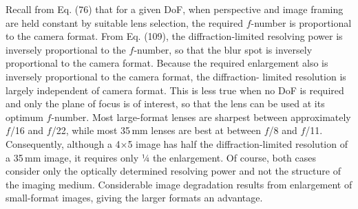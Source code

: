 \documentclass[11pt, oneside]{scrartcl}   	%
\begin{document}
Recall from Eq. (76) that for a given DoF, when perspective and
image framing are held constant by suitable lens selection, the
required $f$-number is proportional to the camera format. From
Eq. (109), the diffraction-limited resolving power is inversely
proportional to the $f$-number, so that the blur spot is inversely proportional to the camera format. Because the required enlargement also is inversely proportional to the camera format, the diffraction- limited resolution is largely independent of camera format. This is less true when no DoF is required and only the plane of focus is of interest, so that the lens can be used at its optimum $f$-number. Most large-format lenses are sharpest between approximately $f$/16 and $f$/22, while most 35\,mm lenses are best at between $f$/8 and $f$/11. Consequently, although a 4$\times$5 image has half the diffraction-limited resolution of a 35\,mm image, it requires only 1⁄4 the enlargement. Of course, both cases consider only the optically determined resolving power and not the structure of the imaging medium. Considerable image degradation results from enlargement of small-format images, giving the larger formats an advantage.
\end{document}

